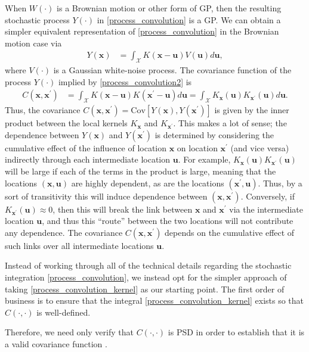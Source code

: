 \documentclass[12pt]{article}
\newcommand{\Cov}{\mathrm{Cov}}
\newcommand{\Ker}{K}
\newcommand{\covFun}{C}
\newcommand{\locSpace}{\mathcal{X}}
\newcommand{\loc}{\mathbf{x}}
\newcommand{\locTwo}{\loc^\prime}
\newcommand{\locDum}{\mathbf{u}}
\newcommand{\rf}{Y}
\begin{document}
When $W(\cdot)$ is a Brownian motion or other form of GP, then the resulting stochastic process $\rf(\cdot)$ in \ref{process_convolution} is a 
GP. We can obtain a simpler equivalent representation of \ref{process_convolution} in the Brownian motion case via
\begin{align}
\rf(\loc) &= \int_{\locSpace} \Ker(\loc - \locDum) V(\locDum) d\locDum, \label{process_convolution2}
\end{align}
where $V(\cdot)$ is a Gaussian white-noise process. The covariance function of the process $\rf(\cdot)$ implied by \ref{process_convolution2} is 
\begin{align}
\covFun(\loc, \locTwo) &= \int_{\locSpace} \Ker(\loc - \locDum)\Ker(\locTwo - \locDum) d\locDum =  \int_{\locSpace} \Ker_{\loc}(\locDum)\Ker_{\locTwo}(\locDum) d\locDum. \label{process_convolution_kernel}
\end{align}
Thus, the covariance $\covFun(\loc, \locTwo) = \Cov[\rf(\loc), \rf(\locTwo)]$ is given by the inner product between the local kernels $\Ker_{\loc}$ and $\Ker_{\locTwo}$. 
This makes a lot of sense; the dependence between $\rf(\loc)$ and $\rf(\locTwo)$ is determined by considering the cumulative effect of the influence of location $\loc$ on location $\locTwo$ (and vice versa) 
indirectly through each intermediate location $\locDum$. For example, $\Ker_{\loc}(\locDum)\Ker_{\locTwo}(\locDum)$ will be large if each of the terms in the product is large, meaning that the locations 
$(\loc, \locDum)$ are highly dependent, as are the locations $(\locTwo, \locDum)$. Thus, by a sort of transitivity this will induce dependence between $(\loc, \locTwo)$. Conversely, if 
$\Ker_{\locTwo}(\locDum) \approx 0$, then this will break the link between $\loc$ and $\locTwo$ via the intermediate location $\locDum$, and thus this ``route'' between the two locations will not contribute 
any dependence. The covariance $\covFun(\loc, \locTwo)$ depends on the cumulative effect of such links over all intermediate locations $\locDum$. 

Instead of working through all of the technical details regarding the stochastic integration \ref{process_convolution}, we instead opt for the simpler approach of taking \ref{process_convolution_kernel}
as our starting point. The first order of business is to ensure that the integral \ref{process_convolution_kernel} exists so that $\covFun(\cdot, \cdot)$ is well-defined. 


Therefore, we need only verify that $\covFun(\cdot, \cdot)$ is PSD in order to establish that it is a valid covariance function \cite{Paciorek}. 
\end{document}
